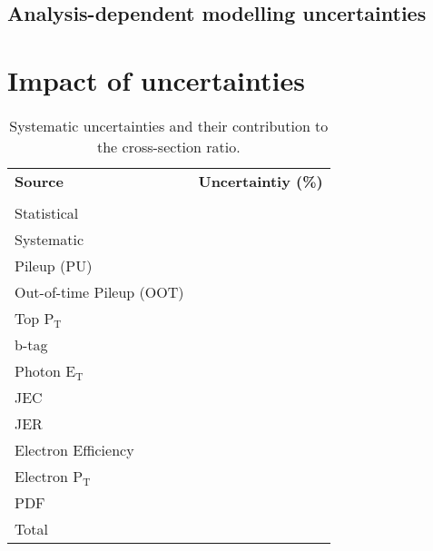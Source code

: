 \subsection{Analysis-dependent modelling uncertainties}

\section{Impact of uncertainties}

\begin{table}[h!] \label{tab-systuncerts}
\centering
\begin{tabular}{|l|c|c|}
\hline
\textbf{Source} & \multicolumn{2}{c|}{\textbf{Uncertaintiy (\%)}} \\ \cline{2-3}
 &  & \\
\hline
Statistical & & \\
\hline
Systematic & & \\
\hline
Pileup (PU) & & \\
Out-of-time Pileup (OOT) & & \\
Top P$_{\text{T}}$ & & \\
b-tag & & \\
Photon E$_{\text{T}}$ & & \\
JEC & & \\
JER & & \\
Electron Efficiency & & \\
Electron P$_{\text{T}}$ & & \\
PDF & & \\
\hline
Total & & \\
\hline
\end{tabular} 
\caption{Systematic uncertainties and their contribution to the cross-section ratio.}
\end{table}

